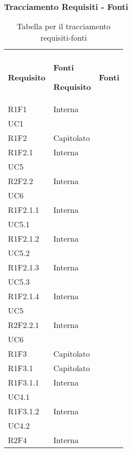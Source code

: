 \newpage
\subsubsection{Tracciamento Requisiti - Fonti}

\renewcommand{\arraystretch}{2.2}

\begin{longtable}{|C{6.5cm}|C{6.5cm}|}
	\caption{Tabella per il tracciamento requisiti-fonti}\\
	\textbf{Requisito} & \textbf{Fonti} 
	\endfirsthead

	\hline
	
	\textbf{Requisito} & \textbf{Fonti} 
	\tabularnewline
	\endhead
	
	R1F1 & \centering Interna \\ UC1 \tabularnewline
	
	R1F2 & Capitolato \\
	
	R1F2.1 & \centering Interna \\ UC5 \tabularnewline
	
	R2F2.2 & \centering Interna \\ UC6 \tabularnewline
	
	R1F2.1.1 & \centering Interna \\ UC5.1 \tabularnewline
	
	R1F2.1.2 &   \centering Interna \\ UC5.2 \tabularnewline
	
	R1F2.1.3 &  \centering Interna \\ UC5.3 \tabularnewline
	
	R1F2.1.4 &  \centering Interna \\ UC5 \tabularnewline
	
	R2F2.2.1 &  \centering Interna \\ UC6 \tabularnewline
	
	R1F3 & Capitolato \\
	
	R1F3.1 & Capitolato \\
	
	R1F3.1.1 &  \centering Interna \\ UC4.1 \tabularnewline
	
	R1F3.1.2 &  \centering Interna \\ UC4.2 \tabularnewline
	
	R2F4 &  Interna \\
	

\end{longtable}
